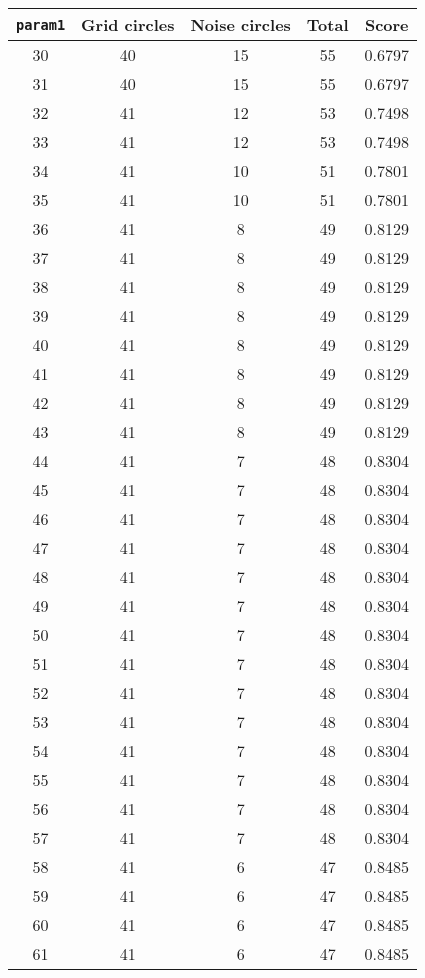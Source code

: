 \documentclass[letterpaper, 12pt]{article}
\begin{document}
\begin{longtable}{|c|c|c|c|c|}
\hline
\textbf{\texttt{param1}} & \textbf{Grid circles} & \textbf{Noise circles} & \textbf{Total} & \textbf{Score} \\
\hline
30 & 40 & 15 & 55 & 0.6797 \\
\hline
31 & 40 & 15 & 55 & 0.6797 \\
\hline
32 & 41 & 12 & 53 & 0.7498 \\
\hline
33 & 41 & 12 & 53 & 0.7498 \\
\hline
34 & 41 & 10 & 51 & 0.7801 \\
\hline
35 & 41 & 10 & 51 & 0.7801 \\
\hline
36 & 41 & 8 & 49 & 0.8129 \\
\hline
37 & 41 & 8 & 49 & 0.8129 \\
\hline
38 & 41 & 8 & 49 & 0.8129 \\
\hline
39 & 41 & 8 & 49 & 0.8129 \\
\hline
40 & 41 & 8 & 49 & 0.8129 \\
\hline
41 & 41 & 8 & 49 & 0.8129 \\
\hline
42 & 41 & 8 & 49 & 0.8129 \\
\hline
43 & 41 & 8 & 49 & 0.8129 \\
\hline
44 & 41 & 7 & 48 & 0.8304 \\
\hline
45 & 41 & 7 & 48 & 0.8304 \\
\hline
46 & 41 & 7 & 48 & 0.8304 \\
\hline
47 & 41 & 7 & 48 & 0.8304 \\
\hline
48 & 41 & 7 & 48 & 0.8304 \\
\hline
49 & 41 & 7 & 48 & 0.8304 \\
\hline
50 & 41 & 7 & 48 & 0.8304 \\
\hline
51 & 41 & 7 & 48 & 0.8304 \\
\hline
52 & 41 & 7 & 48 & 0.8304 \\
\hline
53 & 41 & 7 & 48 & 0.8304 \\
\hline
54 & 41 & 7 & 48 & 0.8304 \\
\hline
55 & 41 & 7 & 48 & 0.8304 \\
\hline
56 & 41 & 7 & 48 & 0.8304 \\
\hline
57 & 41 & 7 & 48 & 0.8304 \\
\hline
58 & 41 & 6 & 47 & 0.8485 \\
\hline
59 & 41 & 6 & 47 & 0.8485 \\
\hline
60 & 41 & 6 & 47 & 0.8485 \\
\hline
61 & 41 & 6 & 47 & 0.8485 \\

\end{longtable}
\end{document}
